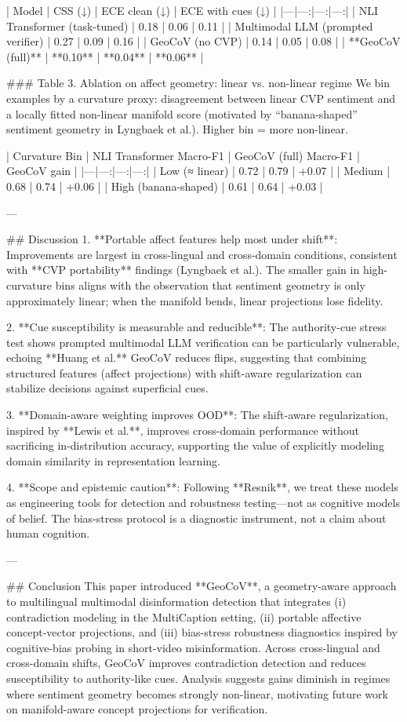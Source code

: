 | Model | CSS (↓) | ECE clean (↓) | ECE with cues (↓) |
|---|---:|---:|---:|
| NLI Transformer (task-tuned) | 0.18 | 0.06 | 0.11 |
| Multimodal LLM (prompted verifier) | 0.27 | 0.09 | 0.16 |
| GeoCoV (no CVP) | 0.14 | 0.05 | 0.08 |
| **GeoCoV (full)** | **0.10** | **0.04** | **0.06** |

### Table 3. Ablation on affect geometry: linear vs. non-linear regime  
We bin examples by a curvature proxy: disagreement between linear CVP sentiment and a locally fitted non-linear manifold score (motivated by “banana-shaped” sentiment geometry in Lyngbaek et al.). Higher bin = more non-linear.

| Curvature Bin | NLI Transformer Macro-F1 | GeoCoV (full) Macro-F1 | GeoCoV gain |
|---|---:|---:|---:|
| Low (≈ linear) | 0.72 | 0.79 | +0.07 |
| Medium | 0.68 | 0.74 | +0.06 |
| High (banana-shaped) | 0.61 | 0.64 | +0.03 |

---

## Discussion  
1. **Portable affect features help most under shift**: Improvements are largest in cross-lingual and cross-domain conditions, consistent with **CVP portability** findings (Lyngbaek et al.). The smaller gain in high-curvature bins aligns with the observation that sentiment geometry is only approximately linear; when the manifold bends, linear projections lose fidelity.

2. **Cue susceptibility is measurable and reducible**: The authority-cue stress test shows prompted multimodal LLM verification can be particularly vulnerable, echoing **Huang et al.** GeoCoV reduces flips, suggesting that combining structured features (affect projections) with shift-aware regularization can stabilize decisions against superficial cues.

3. **Domain-aware weighting improves OOD**: The shift-aware regularization, inspired by **Lewis et al.**, improves cross-domain performance without sacrificing in-distribution accuracy, supporting the value of explicitly modeling domain similarity in representation learning.

4. **Scope and epistemic caution**: Following **Resnik**, we treat these models as engineering tools for detection and robustness testing—not as cognitive models of belief. The bias-stress protocol is a diagnostic instrument, not a claim about human cognition.

---

## Conclusion  
This paper introduced **GeoCoV**, a geometry-aware approach to multilingual multimodal disinformation detection that integrates (i) contradiction modeling in the MultiCaption setting, (ii) portable affective concept-vector projections, and (iii) bias-stress robustness diagnostics inspired by cognitive-bias probing in short-video misinformation. Across cross-lingual and cross-domain shifts, GeoCoV improves contradiction detection and reduces susceptibility to authority-like cues. Analysis suggests gains diminish in regimes where sentiment geometry becomes strongly non-linear, motivating future work on manifold-aware concept projections for verification.

